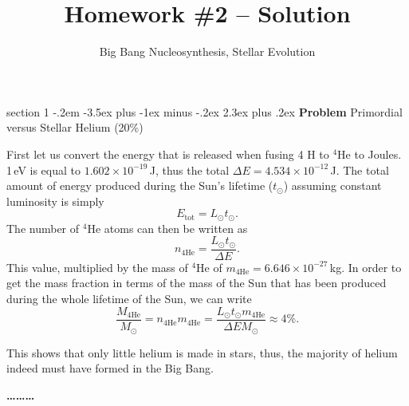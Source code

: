 \documentclass[letterpaper,12pt,twoside=false,DIV=11]{scrartcl}
\makeatletter
\newcommand{\topic}{\author}
\newenvironment{problem}{\@startsection
    {section}
    {1}
    {-.2em}
    {-3.5ex plus -1ex minus -.2ex}
    {2.3ex plus .2ex}
    {
        \pagebreak[3] %
        \noindent\sffamily\bfseries Problem
    }
}
{
    \begin{center}\large\bfseries\ldots\ldots\ldots\end{center}
}
\providecommand{\ex}[1]{\ensuremath{^{#1}}}
\makeatother
\begin{document}
\title{Homework \#2 -- Solution}
\topic{Big Bang Nucleosynthesis, Stellar Evolution}

\maketitle
\thispagestyle{fancy}


\begin{problem}{Primordial versus Stellar Helium (20\%)}

First let us convert the energy that is released when fusing 4 H to \ex{4}He to Joules. 1\,eV is equal to $1.602\times10^{-19}$\,J, thus the total $\Delta E = 4.534 \times 10^{-12}$\,J. The total amount of energy produced during the Sun's lifetime ($t_\odot$) assuming constant luminosity is simply
\begin{equation}
    E_\mathrm{tot} = L_\odot t_\odot.
\end{equation}
The number of \ex{4}He atoms can then be written as
\begin{equation}
    n_\mathrm{4He} = \frac{L_\odot t_\odot}{\Delta E}.
\end{equation}
This value, multiplied by the mass of \ex{4}He of $m_\mathrm{4He} = 6.646 \times 10^{-27}$\,kg. In order to get the mass fraction in terms of the mass of the Sun that has been produced during the whole lifetime of the Sun, we can write
\begin{equation}
    \frac{M_\mathrm{4He}}{M_\odot} = n_\mathrm{4He} m_\mathrm{4He} = \frac{L_\odot t_\odot m_\mathrm{4He}}{\Delta E M_\odot} \approx 4\%.
\end{equation}

This shows that only little helium is made in stars, thus, the majority of helium indeed must have formed in the Big Bang.

\end{problem}
\end{document}
